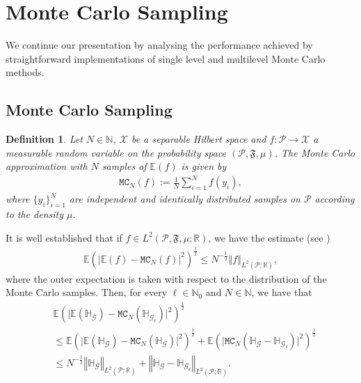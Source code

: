 \documentclass{article}
\newtheorem{definition}[theorem]{Definition}
\newcommand{\cG}{\mathcal{G}}
\newcommand{\cP}{\mathcal{P}}
\newcommand{\cX}{\mathcal{X}}
\newcommand{\fF}{\mathfrak{F}}
\newcommand{\IE}{\mathbb{E}}
\newcommand{\IH}{\mathbb{H}}
\newcommand{\IN}{\mathbb{N}}
\newcommand{\IR}{\mathbb{R}}
\newcommand{\norm}[2]{{\left\Vert #2 \right\Vert}_{#1}}
\newcommand{\lp}[2]{{L}^{#1}( #2 )}
\newcommand{\probspace}{\cP, \fF, \mu}
\newcommand{\probspacepar}{(\probspace )}
\newcommand{\mc}[2]{\mathtt{MC}_{#1}{\left(#2\right)}}
\theoremstyle{definition}
\begin{document}
\section{Monte Carlo Sampling}
\label{sec:MC}
We continue our presentation by analysing the performance achieved by
straightforward implementations of single level and multilevel
Monte Carlo methods.
\subsection{Monte Carlo Sampling}
\begin{definition}
  Let $N\in\IN$, $\cX$ be a separable Hilbert space and $f:\cP\to\cX$ a measurable random variable on the probability space
  $\probspacepar$. The Monte Carlo approximation with $N$ samples of $\IE(f)$ is given by
  \begin{align}
    \mc{N}{f}:=\frac{1}{N}\sum\limits_{i=1}^Nf(y_i),
  \end{align}
  where $\{y_i\}_{i=1}^{N}$ are independent and identically distributed samples on $\cP$
  according to the density $\mu$.
\end{definition}
It is well established that if $f\in\lp{2}{\probspace; \IR}$, we have the estimate (see \cite[Lemma 4.1]{barthMultilevelMonteCarlo2011})
\begin{align}
\label{eq:erMC}
  \IE\left(\vert \IE\left(f\right)-\mc{N}{f}\vert^{2}\right)^{\frac{1}{2}}
  \leq N^{-\frac{1}{2}}\norm{\lp{2}{\cP;\IR}}{f},
\end{align}
where the outer expectation is taken with respect to the distribution of the Monte Carlo samples.
Then, for every $\ell\in\IN_0$ and $N\in\IN$, we have that
\begin{align*}
  &\IE\left(\vert \IE\left(\IH_{\cG}\right)-\mc{N}{\IH_{\cG_\ell}}\vert^{2}\right)^{\frac{1}{2}}\\
  &\leq \IE\left(\vert \IE\left(\IH_{\cG}\right)-\mc{N}{\IH_{\cG}}\vert^{2}\right)^{\frac{1}{2}}
    +
    \IE\left(\vert \mc{N}{\IH_{\cG}-\IH_{\cG_\ell}}\vert^{2}\right)^{\frac{1}{2}}\\
  &\leq N^{-\frac{1}{2}}\norm{\lp{2}{\cP;\IR}}{\IH_{\cG}}+\norm{\lp{2}{\cP;\IR}}{\IH_{\cG}-\IH_{\cG_\ell}}.
\end{align*}
\end{document}

